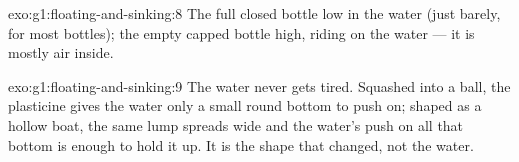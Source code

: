 \begin{solution}{exo:g1:floating-and-sinking:8}
The full closed bottle  low in the water (just barely, for most
bottles); the empty capped bottle  high, riding on the water
--- it is mostly air inside.
\end{solution}

\begin{solution}{exo:g1:floating-and-sinking:9}
The water never gets tired. Squashed into a ball, the plasticine
gives the water only a small round bottom to push on; shaped as a
hollow boat, the same lump spreads wide and the water's push on all
that bottom is enough to hold it up. It is the shape that changed,
not the water.
\end{solution}
